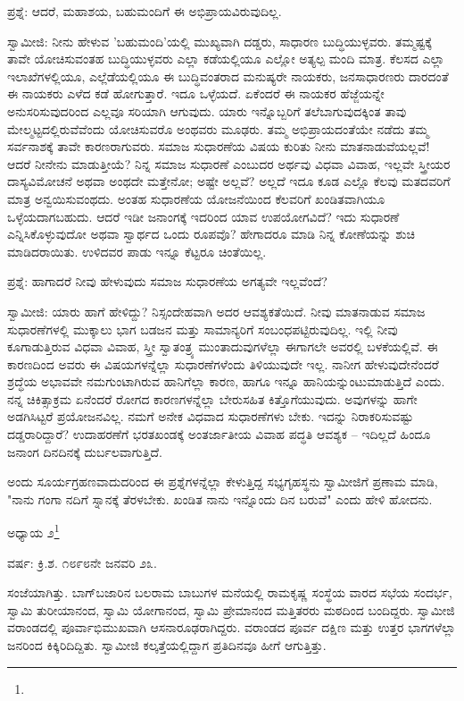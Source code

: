 ಪ್ರಶ್ನೆ: ಆದರೆ, ಮಹಾಶಯ, ಬಹುಮಂದಿಗೆ ಈ ಅಭಿಪ್ರಾಯವಿರುವುದಿಲ್ಲ.

ಸ್ವಾಮೀಜಿ: ನೀನು ಹೇಳುವ 'ಬಹುಮಂದಿ'ಯಲ್ಲಿ ಮುಖ್ಯವಾಗಿ ದಡ್ಡರು, ಸಾಧಾರಣ ಬುದ್ಧಿಯುಳ್ಳವರು. ತಮ್ಮಷ್ಟಕ್ಕೆ ತಾವೇ ಯೋಚಿಸುವಂತಹ ಬುದ್ಧಿಯುಳ್ಳವರು ಎಲ್ಲಾ ಕಡೆಯಲ್ಲಿಯೂ ಎಲ್ಲೋ ಅತ್ಯಲ್ಪ ಮಂದಿ ಮಾತ್ರ. ಕೆಲಸದ ಎಲ್ಲಾ ಇಲಾಖೆಗಳಲ್ಲಿಯೂ, ಎಲ್ಲೆಡೆಯಲ್ಲಿಯೂ ಈ ಬುದ್ಧಿವಂತರಾದ ಮನುಷ್ಯರೇ ನಾಯಕರು, ಜನಸಾಧಾರಣರು ದಾರದಂತೆ ಈ ನಾಯಕರು ಎಳೆದ ಕಡೆ ಹೋಗುತ್ತಾರೆ. ಇದೂ ಒಳ್ಳೆಯದೆ. ಏಕೆಂದರೆ ಈ ನಾಯಕರ ಹೆಜ್ಜೆಯನ್ನೇ ಅನುಸರಿಸುವುದರಿಂದ ಎಲ್ಲವೂ ಸರಿಯಾಗಿ ಆಗುವುದು. ಯಾರು ಇನ್ನೊಬ್ಬರಿಗೆ ತಲೆಬಾಗುವುದಕ್ಕಿಂತ ತಾವು ಮೇಲ್ಮಟ್ಟದಲ್ಲಿರುವೆವೆಂದು ಯೋಚಿಸುವರೊ ಅಂಥವರು ಮೂಢರು. ತಮ್ಮ ಅಭಿಪ್ರಾಯದಂತೆಯೇ ನಡೆದು ತಮ್ಮ ಸರ್ವನಾಶಕ್ಕೆ ತಾವೇ ಕಾರಣರಾಗುವರು. ಸಮಾಜ ಸುಧಾರಣೆಯ ವಿಷಯ ಕುರಿತು ನೀನು ಮಾತನಾಡುವೆಯಲ್ಲವೆ! ಆದರೆ ನೀನೇನು ಮಾಡುತ್ತೀಯೆ? ನಿನ್ನ ಸಮಾಜ ಸುಧಾರಣೆ ಎಂಬುದರ ಅರ್ಥವು ವಿಧವಾ ವಿವಾಹ, ಇಲ್ಲವೇ ಸ್ತ್ರೀಯರ ದಾಸ್ಯವಿಮೋಚನೆ ಅಥವಾ ಅಂಥದೇ ಮತ್ತೇನೋ; ಅಷ್ಟೇ ಅಲ್ಲವೆ? ಅಲ್ಲದೆ ಇದೂ ಕೂಡ ಎಲ್ಲೊ ಕೆಲವು ಮತದವರಿಗೆ ಮಾತ್ರ ಅನ್ವಯಿಸುವಂಥದು. ಅಂತಹ ಸುಧಾರಣೆಯ ಯೋಜನೆಯಿಂದ ಕೆಲವರಿಗೆ ಖಂಡಿತವಾಗಿಯೂ ಒಳ್ಳೆಯದಾಗಬಹುದು. ಆದರೆ ಇಡೀ ಜನಾಂಗಕ್ಕೆ ಇದರಿಂದ ಯಾವ ಉಪಯೋಗವಿದೆ? ಇದು ಸುಧಾರಣೆ ಎನ್ನಿಸಿಕೊಳ್ಳುವುದೋ ಅಥವಾ ಸ್ವಾರ್ಥದ ಒಂದು ರೂಪವೊ? ಹೇಗಾದರೂ ಮಾಡಿ ನಿನ್ನ ಕೋಣೆಯನ್ನು ಶುಚಿ ಮಾಡಿದರಾಯಿತು. ಉಳಿದವರ ಪಾಡು ಇನ್ನೂ ಕೆಟ್ಟರೂ ಚಿಂತೆಯಿಲ್ಲ.

ಪ್ರಶ್ನೆ: ಹಾಗಾದರೆ ನೀವು ಹೇಳುವುದು ಸಮಾಜ ಸುಧಾರಣೆಯ ಅಗತ್ಯವೇ ಇಲ್ಲವೆಂದೆ?

ಸ್ವಾಮೀಜಿ: ಯಾರು ಹಾಗೆ ಹೇಳಿದ್ದು? ನಿಸ್ಸಂದೇಹವಾಗಿ ಅದರ ಆವಶ್ಯಕತೆಯಿದೆ. ನೀವು ಮಾತನಾಡುವ ಸಮಾಜ ಸುಧಾರಣೆಗಳಲ್ಲಿ ಮುಕ್ಕಾಲು ಭಾಗ ಬಡಜನ ಮತ್ತು ಸಾಮಾನ್ಯರಿಗೆ ಸಂಬಂಧಪಟ್ಟಿರುವುದಿಲ್ಲ. ಇಲ್ಲಿ ನೀವು ಕೂಗಾಡುತ್ತಿರುವ ವಿಧವಾ ವಿವಾಹ, ಸ್ತ್ರೀ ಸ್ವಾತಂತ್ರ್ಯ ಮುಂತಾದುವುಗಳೆಲ್ಲಾ ಈಗಾಗಲೇ ಅವರಲ್ಲಿ ಬಳಕೆಯಲ್ಲಿವೆ. ಈ ಕಾರಣದಿಂದ ಅವರು ಈ ವಿಷಯಗಳನ್ನೆಲ್ಲಾ ಸುಧಾರಣೆಗಳೆಂದು ತಿಳಿಯುವುದೇ ಇಲ್ಲ. ನಾನೀಗ ಹೇಳುವುದೇನೆಂದರೆ ಶ್ರದ್ಧೆಯ ಅಭಾವವೇ ನಮಗುಂಟಾಗಿರುವ ಹಾನಿಗೆಲ್ಲಾ ಕಾರಣ, ಹಾಗೂ ಇನ್ನೂ ಹಾನಿಯನ್ನುಂಟುಮಾಡುತ್ತಿದೆ ಎಂದು. ನನ್ನ ಚಿಕಿತ್ಸಾಕ್ರಮ ಏನೆಂದರೆ ರೋಗದ ಕಾರಣಗಳನ್ನೆಲ್ಲಾ ಬೇರುಸಹಿತ ಕಿತ್ತೊಗೆಯುವುದು. ಅವುಗಳನ್ನು ಹಾಗೇ ಅಡಗಿಸಿಟ್ಟರೆ ಪ್ರಯೋಜನವಿಲ್ಲ. ನಮಗೆ ಅನೇಕ ವಿಧವಾದ ಸುಧಾರಣೆಗಳು ಬೇಕು. ಇದನ್ನು ನಿರಾಕರಿಸುವಷ್ಟು ದಡ್ಡರಾರಿದ್ದಾರೆ? ಉದಾಹರಣೆಗೆ ಭರತಖಂಡಕ್ಕೆ ಅಂತರ್ಜಾತೀಯ ವಿವಾಹ ಪದ್ಧತಿ ಆವಶ್ಯಕ – ಇದಿಲ್ಲದೆ ಹಿಂದೂ ಜನಾಂಗ ದಿನದಿನಕ್ಕೆ ದುರ್ಬಲವಾಗುತ್ತಿದೆ.

ಅಂದು ಸೂರ್ಯಗ್ರಹಣವಾದುದರಿಂದ ಈ ಪ್ರಶ್ನೆಗಳನ್ನೆಲ್ಲಾ ಕೇಳುತ್ತಿದ್ದ ಸಭ್ಯಗೃಹಸ್ಥನು ಸ್ವಾಮೀಜಿಗೆ ಪ್ರಣಾಮ ಮಾಡಿ, "ನಾನು ಗಂಗಾ ನದಿಗೆ ಸ್ನಾನಕ್ಕೆ ತೆರಳಬೇಕು. ಖಂಡಿತ ನಾನು ಇನ್ನೊಂದು ದಿನ ಬರುವೆ" ಎಂದು ಹೇಳಿ ಹೋದನು.

ಅಧ್ಯಾಯ ೨\protect\footnote{}

\begin{center}
ವರ್ಷ: ಕ್ರಿ.ಶ. ೧೮೯೮ನೇ ಜನವರಿ ೨೩.
\end{center}

ಸಂಜೆಯಾಗಿತ್ತು. ಬಾಗ್‌ಬಜಾರಿನ ಬಲರಾಮ ಬಾಬುಗಳ ಮನೆಯಲ್ಲಿ ರಾಮಕೃಷ್ಣ ಸಂಸ್ಥೆಯ ವಾರದ ಸಭೆಯ ಸಂದರ್ಭ, ಸ್ವಾಮಿ ತುರೀಯಾನಂದ, ಸ್ವಾಮಿ ಯೋಗಾನಂದ, ಸ್ವಾಮಿ ಪ್ರೇಮಾನಂದ ಮತ್ತಿತರರು ಮಠದಿಂದ ಬಂದಿದ್ದರು. ಸ್ವಾಮೀಜಿ ವರಾಂಡದಲ್ಲಿ ಪೂರ್ವಾಭಿಮುಖವಾಗಿ ಆಸನಾರೂಢರಾಗಿದ್ದರು. ವರಾಂಡದ ಪೂರ್ವ ದಕ್ಷಿಣ ಮತ್ತು ಉತ್ತರ ಭಾಗಗಳೆಲ್ಲಾ ಜನರಿಂದ ಕಿಕ್ಕಿರಿದಿದ್ದಿತು. ಸ್ವಾಮೀಜಿ ಕಲ್ಕತ್ತೆಯಲ್ಲಿದ್ದಾಗ ಪ್ರತಿದಿನವೂ ಹೀಗೆ ಆಗುತ್ತಿತ್ತು.

